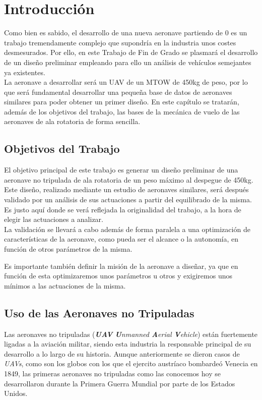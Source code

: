 \thispagestyle{empty}
\chapter{Introducción}

Como bien es sabido, el desarrollo de una nueva aeronave partiendo de 0 es un trabajo tremendamente complejo que supondría en la industria unos costes desmesurados. Por ello, en este Trabajo de Fin de Grado se plasmará el desarrollo de un diseño preliminar empleando para ello un análisis de vehículos semejantes ya existentes.\\

La aeronave a desarrollar será un UAV de un MTOW de 450kg de peso, por lo que será fundamental desarrollar una pequeña base de datos de aeronaves similares para poder obtener un primer diseño.
En este capítulo se tratarán, además de los objetivos del trabajo, las bases de la mecánica de vuelo de las aeronaves de ala rotatoria de forma sencilla.

\section{Objetivos del Trabajo}

El objetivo principal de este trabajo es generar un diseño preliminar de una aeronave no tripulada de ala rotatoria de un peso máximo al despegue de 450kg. Este diseño, realizado mediante un estudio de aeronaves similares, será después validado por un análisis de sus actuaciones a partir del equilibrado de la misma.
Es justo aquí donde se verá reflejada la originalidad del trabajo, a la hora de elegir las actuaciones a analizar.\\

La validación se llevará a cabo además de forma paralela a una optimización de características de la aeronave, como pueda ser el alcance o la autonomía, en función de otros parámetros de la misma.

Es importante también definir la misión de la aeronave a diseñar, ya que en función de esta optimizaremos unos parámetros u otros y exigiremos unos mínimos a las actuaciones de la misma.


\section{Uso de las Aeronaves no Tripuladas}
Las aeronaves no tripuladas (\emph{\textbf{UAV} \textbf{U}nmanned \textbf{A}erial \textbf{V}ehicle}) están fuertemente ligadas a la aviación militar, siendo esta industria la responsable principal de su desarrollo a lo largo de su historia.
Aunque anteriormente se dieron casos de \emph{UAVs}, como son los globos con los que el ejercito austríaco bombardeó Venecia en 1849, las primeras aeronaves no tripuladas como las conocemos hoy se desarrollaron durante la Primera Guerra Mundial por parte de los Estados Unidos.\\

